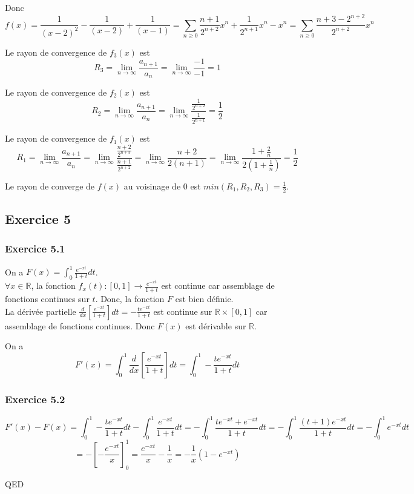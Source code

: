 \documentclass[]{book}
\theoremstyle{definition}
\newcommand{\bb}[1]{\mathbb{#1}}
\newcommand{\R}{\bb{R}}
\begin{document}
Donc 
$$
f(x) = \frac{1}{(x-2)^2} -\frac{1}{(x-2)} + \frac{1}{(x-1)} = \sum_{n \ge 0} \frac{n+1}{2^{n+2}}x^n + \frac{1}{2^{n+1}}x^n -x^n = \sum_{n \ge 0} \frac{n+3-2^{n+2}}{2^{n+2}}x^n
$$ 


Le rayon de convergence de $f_3(x)$ est 
$$R_3 = \lim_{n \to \infty} \frac{a_{n+1}}{a_n} = \lim_{n \to \infty} \frac{-1}{-1} = 1$$

Le rayon de convergence de $f_2(x)$ est 
$$R_2 = \lim_{n \to \infty} \frac{a_{n+1}}{a_n} = \lim_{n \to \infty} \frac{\frac{1}{2^{n+2}}}{\frac{1}{2^{n+1}}} = \frac{1}{2}$$

Le rayon de convergence de $f_1(x)$ est 
$$R_1 = \lim_{n \to \infty} \frac{a_{n+1}}{a_n} = \lim_{n \to \infty} \frac{\frac{n+2}{2^{n+3}}}{\frac{n+1}{2^{n+2}}} = \lim_{n \to \infty} \frac{n+2}{2(n+1)} = \lim_{n \to \infty} \frac{1+\frac{2}{n}}{2(1+\frac{1}{n})} = \frac{1}{2}$$

Le rayon de converge de $f(x)$ au voisinage de 0 est $min(R_1, R_2, R_3) = \frac{1}{2}$.

\subsection*{Exercice 5}
\subsubsection*{Exercice 5.1}
On a $F(x) = \int_{0}^{1}\frac{e^{-xt}}{1+t}dt$. \\
$\forall x \in \R$, la fonction $f_x(t): [0,1] \to \frac{e^{-xt}}{1+t}$ est continue car assemblage de fonctions continues sur $t$. Donc, la fonction $F$ est bien d\'efinie. \\
La d\'eriv\'ee partielle $\frac{d}{dx}\left[ \frac{e^{-xt}}{1+t}\right]dt = -\frac{te^{-xt}}{1+t}$ est continue sur $\R \times [0,1]$ car assemblage de fonctions continues. Donc $F(x)$ est d\'erivable sur $\R$. 

On a 
$$F'(x) = \int_{0}^{1}\frac{d}{dx}\left[ \frac{e^{-xt}}{1+t} \right] dt = \int_{0}^{1}-\frac{te^{-xt}}{1+t} dt$$

\subsubsection*{Exercice 5.2}
$$F'(x) - F(x) = \int_{0}^{1}-\frac{te^{-xt}}{1+t} dt - \int_{0}^{1}\frac{e^{-xt}}{1+t}dt = -\int_{0}^{1}\frac{te^{-xt}+e^{-xt}}{1+t}dt = -\int_{0}^{1}\frac{(t+1)e^{-xt}}{1+t}dt = -\int_{0}^{1}e^{-xt}dt $$
$$= -\left[ - \frac{e^{-xt}}{x}\right]_{0}^{1} = \frac{e^{-xt}}{x} - \frac{1}{x} = -\frac{1}{x}(1-e^{-xt})$$


QED
\end{document}
